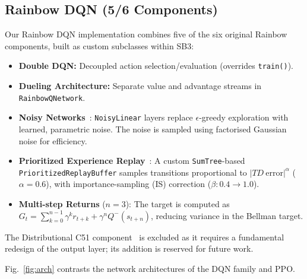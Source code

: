 \documentclass[conference]{IEEEtran}
\begin{document}
\subsection{Rainbow DQN (5/6 Components)}

Our Rainbow DQN implementation combines five of the six original Rainbow components,
built as custom subclasses within SB3:

\begin{itemize}
  \item \textbf{Double DQN:} Decoupled action selection/evaluation (overrides \texttt{train()}).
  \item \textbf{Dueling Architecture:} Separate value and advantage streams in
        \texttt{RainbowQNetwork}.
  \item \textbf{Noisy Networks}~\cite{fortunato2017noisy}: \texttt{NoisyLinear} layers
        replace $\epsilon$-greedy exploration with learned, parametric noise.
        The noise is sampled using factorised Gaussian noise for efficiency.
  \item \textbf{Prioritized Experience Replay}~\cite{schaul2015prioritized}:
        A custom \texttt{SumTree}-based \texttt{PrioritizedReplayBuffer} samples
        transitions proportional to $|TD\ \text{error}|^\alpha$ ($\alpha=0.6$),
        with importance-sampling (IS) correction ($\beta: 0.4 \to 1.0$).
  \item \textbf{Multi-step Returns} ($n=3$): The target is computed as
        $G_t = \sum_{k=0}^{n-1} \gamma^k r_{t+k} + \gamma^n Q^{-}(s_{t+n})$,
        reducing variance in the Bellman target.
\end{itemize}
The Distributional C51 component~\cite{bellemare2017distributional} is excluded as
it requires a fundamental redesign of the output layer; its addition is reserved for
future work.

Fig.~\ref{fig:arch} contrasts the network architectures of the DQN family and PPO.
\end{document}
